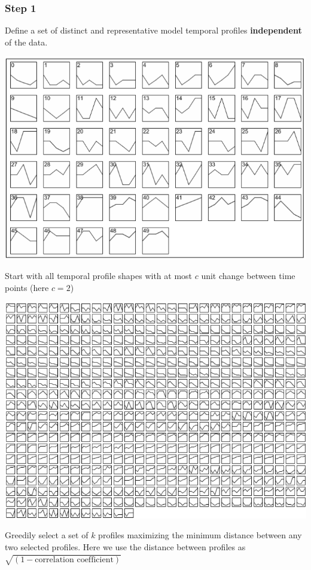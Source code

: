 \documentclass[10pt]{article}
\begin{document}
\subsubsection*{Step 1}
Define a set of distinct and representative model temporal profiles \textbf{independent} of the data.
\begin{center}
    \includegraphics*[width=\textwidth]{W6_42.png}
\end{center}
Start with all temporal profile shapes with at most $c$ unit change between time points (here $c = 2$)
\begin{center}
    \includegraphics*[width=\textwidth]{W6_43.png}
\end{center}
Greedily select a set of $k$ profiles maximizing the minimum distance between any two selected profiles.  Here we use the distance between profiles as $\sqrt{(1 - \text{correlation coefficient})}$
\end{document}
